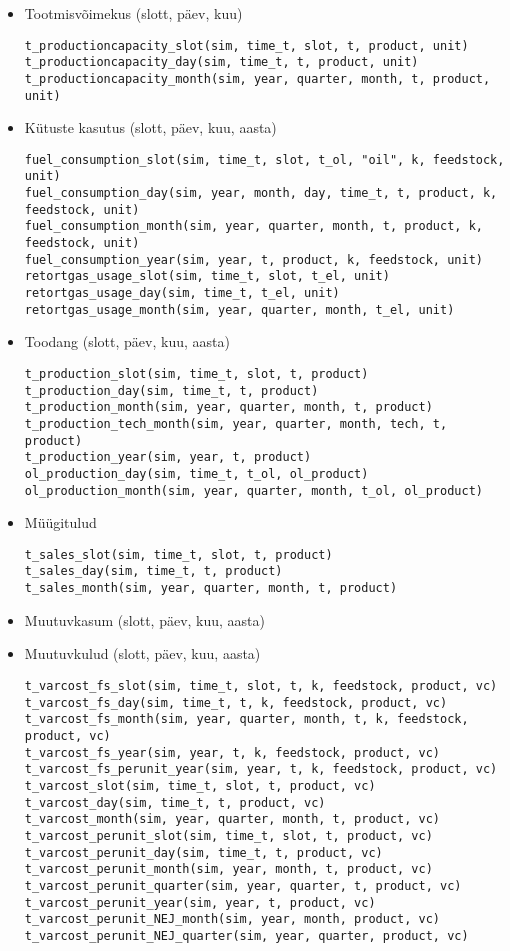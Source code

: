 \begin{itemize}
\item Tootmisvõimekus (slott, päev, kuu)
\begin{verbatim}
t_productioncapacity_slot(sim, time_t, slot, t, product, unit) 
t_productioncapacity_day(sim, time_t, t, product, unit) 
t_productioncapacity_month(sim, year, quarter, month, t, product, unit)
\end{verbatim}

\item Kütuste kasutus (slott, päev, kuu, aasta)
\begin{verbatim}
fuel_consumption_slot(sim, time_t, slot, t_ol, "oil", k, feedstock, unit)
fuel_consumption_day(sim, year, month, day, time_t, t, product, k, feedstock, unit)
fuel_consumption_month(sim, year, quarter, month, t, product, k, feedstock, unit)
fuel_consumption_year(sim, year, t, product, k, feedstock, unit)
retortgas_usage_slot(sim, time_t, slot, t_el, unit)
retortgas_usage_day(sim, time_t, t_el, unit)
retortgas_usage_month(sim, year, quarter, month, t_el, unit)
\end{verbatim}

\item Toodang (slott, päev, kuu, aasta)
\begin{verbatim}
t_production_slot(sim, time_t, slot, t, product) 
t_production_day(sim, time_t, t, product) 
t_production_month(sim, year, quarter, month, t, product)
t_production_tech_month(sim, year, quarter, month, tech, t, product)
t_production_year(sim, year, t, product) 
ol_production_day(sim, time_t, t_ol, ol_product)
ol_production_month(sim, year, quarter, month, t_ol, ol_product)
\end{verbatim}

\item Müügitulud
\begin{verbatim}
t_sales_slot(sim, time_t, slot, t, product)
t_sales_day(sim, time_t, t, product) 
t_sales_month(sim, year, quarter, month, t, product)
\end{verbatim}

\item Muutuvkasum (slott, päev, kuu, aasta)
\item Muutuvkulud (slott, päev, kuu, aasta)
\begin{verbatim}
t_varcost_fs_slot(sim, time_t, slot, t, k, feedstock, product, vc)
t_varcost_fs_day(sim, time_t, t, k, feedstock, product, vc)
t_varcost_fs_month(sim, year, quarter, month, t, k, feedstock, product, vc)
t_varcost_fs_year(sim, year, t, k, feedstock, product, vc)
t_varcost_fs_perunit_year(sim, year, t, k, feedstock, product, vc)
t_varcost_slot(sim, time_t, slot, t, product, vc)
t_varcost_day(sim, time_t, t, product, vc) 
t_varcost_month(sim, year, quarter, month, t, product, vc)
t_varcost_perunit_slot(sim, time_t, slot, t, product, vc)
t_varcost_perunit_day(sim, time_t, t, product, vc)
t_varcost_perunit_month(sim, year, month, t, product, vc)
t_varcost_perunit_quarter(sim, year, quarter, t, product, vc)
t_varcost_perunit_year(sim, year, t, product, vc)
t_varcost_perunit_NEJ_month(sim, year, month, product, vc)
t_varcost_perunit_NEJ_quarter(sim, year, quarter, product, vc)
\end{verbatim}

\end{itemize}